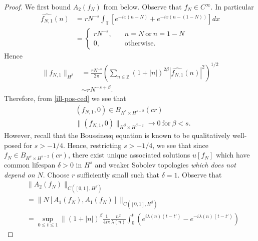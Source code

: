 \documentclass[12pt,reqno]{amsart}
\numberwithin{equation}{section}  %
\newcommand{\zz}{\mathbb{Z}}
\newcommand{\ci}{\mathbb{T}}
\newcommand{\wh}{\widehat}
\begin{document}
%
%
%
%
%
%
%
\begin{proof}
  We first bound $A_{2}(f_{N})$ from below.
  Observe that $f_{N} \in C^{\infty}$. In particular
%
%
\begin{equation}
  \label{ill-pos-ce}
\begin{split}
  \wh{f_{N,1}}(n)
  & = r N^{-s}\int_{\ci} [e^{-ix(n - N)} + e^{-ix(n - (1-N))}]  dx  
  \\ 
  & = 
  \begin{cases}
    r N^{-s},  \quad  & n = N \ \text{or} \ n = 1-N
    \\
     0, \quad  & \text{otherwise}.
  \end{cases}
\end{split}
\end{equation}
%
Hence
%
%
\begin{equation}
  \label{ill-pos-ced}
\begin{split}
  \| f_{N,1} \|_{H^{\beta}}
  & = \frac{rN^{-s}}{2 \pi} \left( \sum_{n \in \zz} (1 + | n |)^{2 \beta} |
  \wh{f_{N,1}}(n) |^{2} \right)^{1/2}
  \\
  & \sim rN^{-s + \beta}.
\end{split}
\end{equation}
%
%
Therefore, from \eqref{ill-pos-ced} we see that 
\begin{equation*}
  \begin{split}
    & (f_{N,1}, 0) \in B_{H^{s} \times H^{s-2}}(cr)  
    \\
    & \|(f_{N,1}, 0)\|_{H^{\beta} \times H^{\beta -2}} \to 0 \ \text{for} \ \beta < s.
    \end{split}
\end{equation*}
However, recall that the Boussinesq equation is known to be qualitatively well-posed for $s > -1/4$. Hence, restricting $s > -1/4$, we see that since $f_{N} \in B_{H^{s} \times H^{s-2}}(cr)$, there exist unique associated 
solutions $u[f_{N}]$ which have common lifespan $\delta > 0$ in $H^{s}$ and weaker Sobolev topologies \emph{which does not depend
on $N$}. Choose $r$ sufficiently small such that $\delta =1$.  
Observe that
%
%
\begin{equation*}
\begin{split}
& \| A_{2}(f_{N}) \|_{C([0, 1], H^{\beta})} 
\\
  &  =  \| N[A_{1}(f_{N}), A_{1}(f_{N})] \|_{C([0, 1],
  H^{\beta})} 
  \\
  & = \sup_{0 \le t \le 1} \|  (1 + | n |)^{\beta}
  \frac{1}{4 i \pi} \frac{n^{2}}{\lambda(n)}
  \int_{0}^{t} \left( e^{i\lambda(n)(t-t')} - e^{-i\lambda(n)(t-t')} \right)

\end{split}
\end{equation*}
\end{proof}
\end{document}
